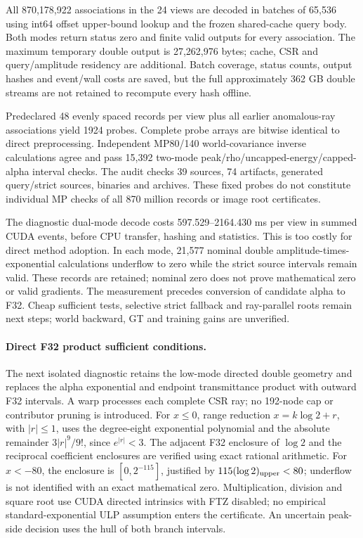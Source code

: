 \documentclass[11pt,a4paper]{article}
\begin{document}
All 870,178,922 associations in the 24 views are decoded in batches of
65,536 using int64 offset upper-bound lookup and the frozen shared-cache
query body. Both modes return status zero and finite valid outputs for
every association. The maximum temporary double output is 27,262,976 bytes;
cache, CSR and query/amplitude residency are additional. Batch coverage,
status counts, output hashes and event/wall costs are saved, but the full
approximately 362 GB double streams are not retained to recompute every
hash offline.

Predeclared 48 evenly spaced records per view plus all earlier anomalous-ray
associations yield 1924 probes. Complete probe arrays are bitwise identical
to direct preprocessing. Independent MP80/140 world-covariance inverse
calculations agree and pass 15,392 two-mode peak/rho/uncapped-energy/capped-
alpha interval checks. The audit checks 39 sources, 74 artifacts, generated
query/strict sources, binaries and archives. These fixed probes do not
constitute individual MP checks of all 870 million records or image root
certificates.

The diagnostic dual-mode decode costs 597.529--2164.430 ms per view in
summed CUDA events, before CPU transfer, hashing and statistics. This is
too costly for direct method adoption. In each mode, 21,577 nominal
double amplitude-times-exponential calculations underflow to zero while
the strict source intervals remain valid. These records are retained;
nominal zero does not prove mathematical zero or valid gradients. The
measurement precedes conversion of candidate alpha to F32. Cheap sufficient
tests, selective strict fallback and ray-parallel roots remain next steps;
world backward, GT and training gains are unverified.

\paragraph{Direct F32 product sufficient conditions.}
The next isolated diagnostic retains the low-mode directed double geometry
and replaces the alpha exponential and endpoint transmittance product with
outward F32 intervals. A warp processes each complete CSR ray; no 192-node
cap or contributor pruning is introduced. For $x\leq0$, range reduction
$x=k\log2+r$, with $|r|\leq1$, uses the degree-eight exponential polynomial
and the absolute remainder $3|r|^9/9!$, since $e^{|r|}<3$. The adjacent F32
enclosure of $\log2$ and the reciprocal coefficient enclosures are verified
using exact rational arithmetic. For $x<-80$, the enclosure is
$[0,2^{-115}]$, justified by $115(\log2)_{\rm upper}<80$;
underflow is not identified with an exact mathematical zero. Multiplication,
division and square root use CUDA directed intrinsics with FTZ disabled;
no empirical standard-exponential ULP assumption enters the certificate.
An uncertain peak-side decision uses the hull of both branch intervals.
\end{document}
